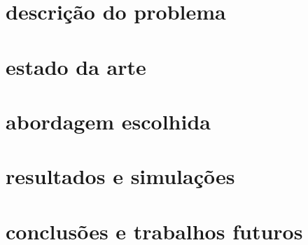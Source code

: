 
\section*{descrição do problema}

\lipsum[1]

\section*{estado da arte}

\lipsum[2]

\section*{abordagem escolhida}

\lipsum[3]

\section*{resultados e simulações}

\lipsum[4]

\section*{conclusões e trabalhos futuros}

\lipsum[5]